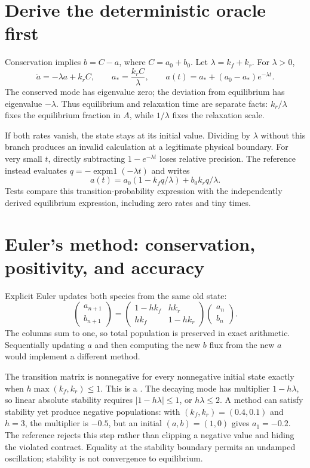 \section{Derive the deterministic oracle first}
Conservation implies $b=C-a$, where $C=a_0+b_0$. Let
$\lambda=k_f+k_r$. For $\lambda>0$,
\[
\dot a=-\lambda a+k_rC,\qquad
a_*=\frac{k_rC}{\lambda},\qquad
a(t)=a_*+(a_0-a_*)e^{-\lambda t}.
\]
The conserved mode has eigenvalue zero; the deviation from equilibrium has
eigenvalue $-\lambda$. Thus equilibrium and relaxation time are separate facts:
$k_r/\lambda$ fixes the equilibrium fraction in $A$, while $1/\lambda$ fixes the
relaxation scale.

If both rates vanish, the state stays at its initial value. Dividing by
$\lambda$ without this branch produces an invalid calculation at a legitimate
physical boundary. For very small $t$, directly subtracting
$1-e^{-\lambda t}$ loses relative precision. The reference instead evaluates
$q=-\operatorname{expm1}(-\lambda t)$ and writes
\[
a(t)=a_0(1-k_fq/\lambda)+b_0 k_rq/\lambda.
\]
Tests compare this transition-probability expression with the independently
derived equilibrium expression, including zero rates and tiny times.

\section{Euler's method: conservation, positivity, and accuracy}
Explicit Euler updates both species from the same old state:
\[
\begin{pmatrix}a_{n+1}\\b_{n+1}\end{pmatrix}
=
\begin{pmatrix}
1-hk_f&hk_r\\ hk_f&1-hk_r
\end{pmatrix}
\begin{pmatrix}a_n\\b_n\end{pmatrix}.
\]
The columns sum to one, so total population is preserved in exact arithmetic.
Sequentially updating $a$ and then computing the new $b$ flux from the new $a$
would implement a different method.

The transition matrix is nonnegative for every nonnegative initial state exactly
when $h\max(k_f,k_r)\le1$. This is a . The decaying
mode has multiplier $1-h\lambda$, so linear absolute stability requires
$|1-h\lambda|\le1$, or $h\lambda\le2$. A method can satisfy stability yet
produce negative populations: with $(k_f,k_r)=(0.4,0.1)$ and $h=3$,
the multiplier is $-0.5$, but an initial $(a,b)=(1,0)$ gives $a_1=-0.2$.
The reference rejects this step rather than clipping a negative value and hiding
the violated contract. Equality at the stability boundary permits an undamped
oscillation; stability is not convergence to equilibrium.

